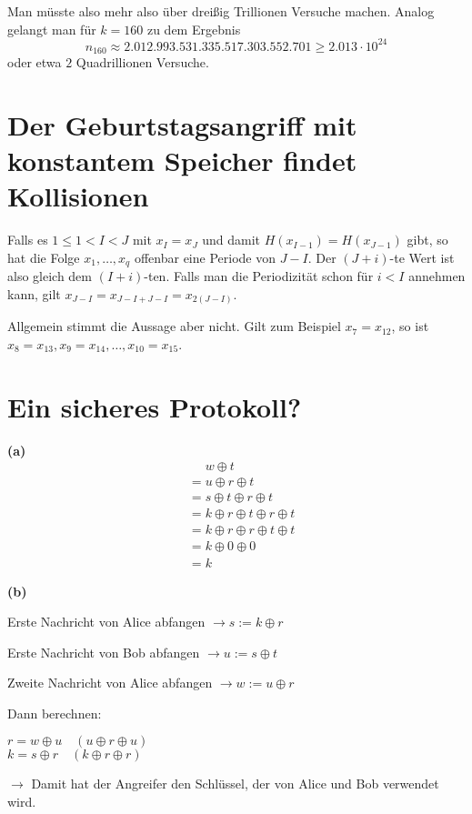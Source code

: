 \documentclass{../crypto}
\begin{document}
Man müsste also mehr also über dreißig Trillionen
Versuche machen. Analog gelangt man für $k=160$ zu dem Ergebnis 
\begin{equation*}
   n_{160} \approx 2.012.993.531.335.517.303.552.701 \ge 2.013 \cdot 10^{24}
\end{equation*}
oder etwa $2$ Quadrillionen Versuche.

\section{Der Geburtstagsangriff mit konstantem Speicher findet Kollisionen}

Falls es $1 \le 1 < I < J$ mit $x_I = x_J$ und damit $H(x_{I-1}) = H(x_{J-1})$
gibt, so hat die Folge $x_1,\ldots,x_q$ offenbar eine Periode von $J - I$. Der
$(J+i)$-te Wert ist also gleich dem $(I+i)$-ten. Falls man die Periodizität schon für $i
< I$ annehmen kann, gilt $x_{J-I} = x_{J-I + J-I} = x_{2(J-I)}$.

Allgemein stimmt die Aussage aber nicht. Gilt zum Beispiel $x_7 = x_{12}$, so
ist $x_8 = x_{13}, x_9 = x_{14},\ldots,x_{10} = x_{15}$.

\section{Ein sicheres Protokoll?}

\textbf{(a)}
\begin{align*}
	&\phantom{=} w \oplus t\\
	&= u \oplus r \oplus t\\
	&= s \oplus t \oplus r \oplus t\\
	&= k \oplus r \oplus t \oplus r \oplus t\\
	&= k \oplus r \oplus r \oplus t \oplus t\\
	&= k \oplus 0 \oplus 0\\
	&= k
\end{align*}

\noindent \textbf{(b)}

\noindent Erste Nachricht von Alice abfangen $\rightarrow s := k \oplus r$

\noindent Erste Nachricht von Bob abfangen $\rightarrow u := s \oplus t$

\noindent Zweite Nachricht von Alice abfangen $\rightarrow w := u \oplus r$

\noindent Dann berechnen:

\smallskip
\noindent$r = w \oplus u \quad \left(u \oplus r \oplus u\right)$\\
$k = s \oplus r \quad \left(k \oplus r \oplus r\right)$

\smallskip
\noindent$\rightarrow$ Damit hat der Angreifer den Schlüssel, der von Alice und Bob verwendet wird.
\end{document}
